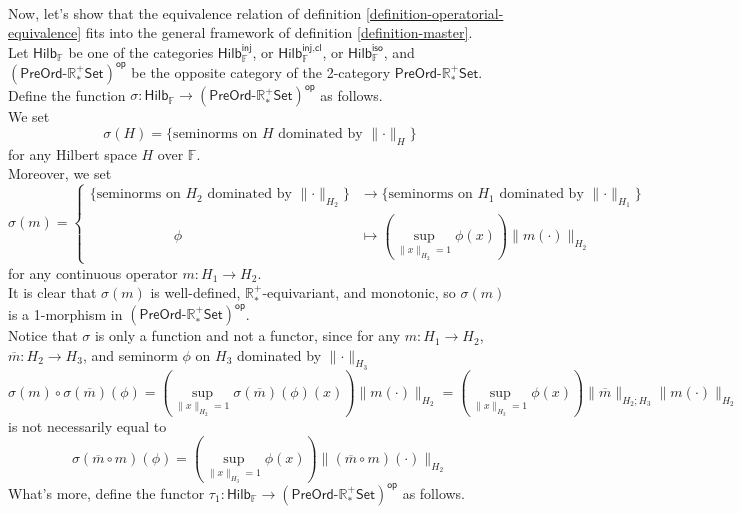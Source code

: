 \documentclass[a4paper,10pt]{article}
\theoremstyle{plain}
\theoremstyle{definition}
\theoremstyle{remark}
\begin{document}
\mbox{} \\
Now, let's show that the equivalence relation of definition \ref{definition-operatorial-equivalence} fits into the general framework of definition \ref{definition-master}. \\
Let $\mathsf{Hilb_\mathbb{F}}$ be one of the categories $\mathsf{Hilb_\mathbb{F}^\text{inj}}$, or $\mathsf{Hilb_\mathbb{F}^\text{inj,cl}}$, or $\mathsf{Hilb_\mathbb{F}^\text{iso}}$, and $\mathsf{(PreOrd\text{-}\mathbb{R}^+_*Set)^{op}}$ be the opposite category of the 2-category $\mathsf{PreOrd\text{-}\mathbb{R}^+_*Set}$. \\
Define the function $\sigma : \mathsf{Hilb_\mathbb{F}} \to \mathsf{(PreOrd\text{-}\mathbb{R}^+_*Set)^{op}}$ as follows. \\
We set
\[ \sigma(H) = \{ \text{seminorms on } H \text{ dominated by } \lVert \cdot \rVert_H \} \]
for any Hilbert space $H$ over $\mathbb{F}$. \\
Moreover, we set
\[ \sigma(m) = \begin{cases} \{ \text{seminorms on } H_2 \text{ dominated by } \lVert \cdot \rVert_{H_2} \} &\to \{ \text{seminorms on } H_1 \text{ dominated by } \lVert \cdot \rVert_{H_1} \} \\ \quad \quad \quad \quad \quad \quad \phi &\mapsto \left( \underset{\lVert x \rVert_{H_2} = 1}{\operatorname{sup}} \phi(x) \right) \lVert m(\cdot) \rVert_{H_2} \end{cases} \]
for any continuous operator $m : H_1 \to H_2$. \\
It is clear that $\sigma(m)$ is well-defined, $\mathbb{R}^+_*$-equivariant, and monotonic, so $\sigma(m)$ is a 1-morphism in $\mathsf{(PreOrd\text{-}\mathbb{R}^+_*Set)^{op}}$. \\
Notice that $\sigma$ is only a function and not a functor, since for any $m : H_1 \to H_2$, $\overline{m} : H_2 \to H_3$, and seminorm $\phi$ on $H_3$ dominated by $\lVert \cdot \rVert_{H_3}$
\[ \sigma(m) \circ \sigma(\overline{m}) (\phi) =  \left( \underset{\lVert x \rVert_{H_2} = 1}{\operatorname{sup}} \sigma(\overline{m})(\phi)(x) \right) \lVert m(\cdot) \rVert_{H_2} =  \left( \underset{\lVert x \rVert_{H_3} = 1}{\operatorname{sup}} \phi(x) \right) \lVert \overline{m} \rVert_{H_2;H_3} \lVert m(\cdot) \rVert_{H_2} \]
is not necessarily equal to
\[ \sigma(\overline{m} \circ m)(\phi)  =  \left( \underset{\lVert x \rVert_{H_3} = 1}{\operatorname{sup}} \phi(x) \right) \lVert (\overline{m} \circ m)(\cdot) \rVert_{H_2} \]
What's more, define the functor $\tau_1 : \mathsf{Hilb_\mathbb{F}} \to \mathsf{(PreOrd\text{-}\mathbb{R}^+_*Set)^{op}}$ as follows. \\
\end{document}
